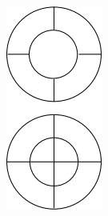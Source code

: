 \begin{figure}
    \includegraphics[width=\textwidth]{images/r-hog}
    \caption{}
    \label{fig:r-hog}
\end{figure}

